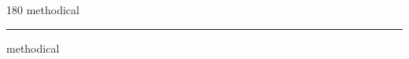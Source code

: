 
\begin{frame}
\begin{center}
\begin{turn}{180}
{\fontsize{2.5cm}{1em}\selectfont methodical}
\end{turn}
\vspace{1em}\par  
\hrule
\vspace{1em}\par  
{\fontsize{2.5cm}{1em}\selectfont methodical}
\end{center}
\end{frame}
